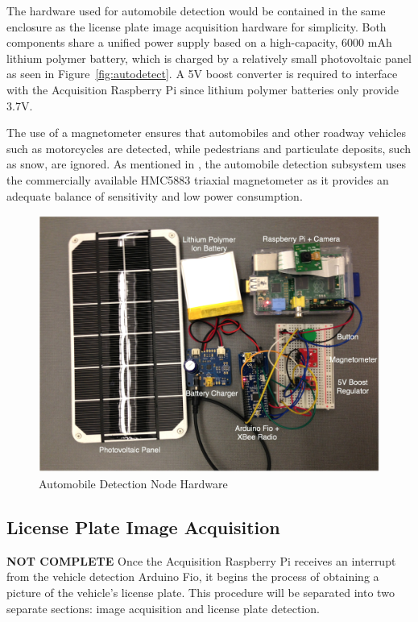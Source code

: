 \documentclass[11pt, oneside, fullpage, doublespace]{article}
\begin{document}
The hardware used for automobile detection would be contained in the same enclosure as the license plate image acquisition hardware for simplicity. Both components share a unified power supply based on a high-capacity, 6000 mAh lithium polymer battery, which is charged by a relatively small photovoltaic panel as seen in Figure~\ref{fig:autodetect}. A 5V boost converter is required to interface with the Acquisition Raspberry Pi since lithium polymer batteries only provide 3.7V.

The use of a magnetometer ensures that automobiles and other roadway vehicles such as motorcycles are detected, while pedestrians and particulate deposits, such as snow, are ignored. As mentioned in \cite{stillwell2013}, the automobile detection subsystem uses the commercially available HMC5883 triaxial magnetometer as it provides an adequate balance of sensitivity and low power consumption.

\begin{figure}
\begin{center}
\includegraphics[width=4.5in]{sensornode}
\end{center}
\caption{Automobile Detection Node Hardware}
\label{fig:autodetecthardware}
\end{figure}

\subsection{License Plate Image Acquisition}
{\color{red}\textbf{NOT COMPLETE}}
Once the Acquisition Raspberry Pi receives an interrupt from the vehicle detection Arduino Fio, it begins the process of obtaining a picture of the vehicle's license plate. This procedure will be separated into two separate sections: image acquisition and license plate detection.
\end{document}
